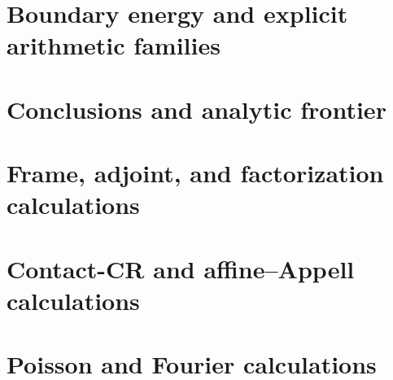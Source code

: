 \documentclass[11pt]{article}
\theoremstyle{definition}
\theoremstyle{remark}
\begin{document}
\section{Boundary energy and explicit arithmetic families}
\label{sec:boundary-energy}


\section{Conclusions and analytic frontier}\label{sec:conclusion}


\appendix

\section{Frame, adjoint, and factorization calculations}
\label{app:frame-calculations}


\section{Contact-CR and affine--Appell calculations}
\label{app:contact-calculations}


\section{Poisson and Fourier calculations}
\label{app:poisson-fourier}




\end{document}
